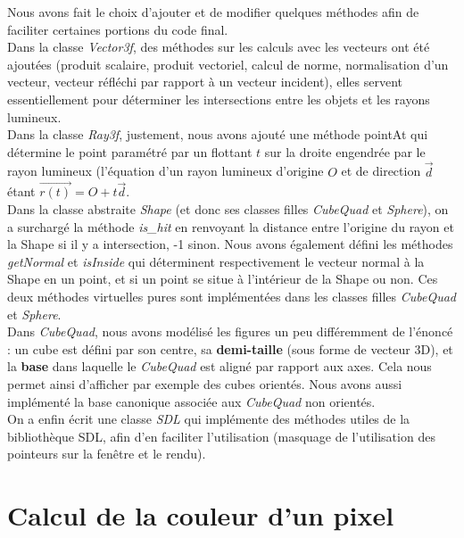 \documentclass[a4paper,oneside,12pt,titlepage]{article}
\begin{document}
\begin{sloppypar}
Nous avons fait le choix d’ajouter et de modifier quelques méthodes afin de faciliter certaines portions du code final. \\[6pt]

Dans la classe \textit{Vector3f}, des méthodes sur les calculs avec les vecteurs ont été ajoutées (produit scalaire, produit vectoriel, calcul de norme, normalisation d’un vecteur, vecteur réfléchi par rapport à un vecteur incident), elles servent essentiellement pour déterminer les intersections entre les objets et les rayons lumineux. \\[6pt]

Dans la classe \textit{Ray3f}, justement, nous avons ajouté une méthode pointAt qui détermine le point paramétré par un flottant $t$ sur la droite engendrée par le rayon lumineux (l'équation d'un rayon lumineux d'origine $O$ et de direction $\vec{d}$ étant $\overrightarrow{r(t)} = O + t\vec{d}$. \\[6pt]

Dans la classe abstraite \textit{Shape} (et donc ses classes filles \textit{CubeQuad} et \textit{Sphere}), on a surchargé la méthode \textit{is\_hit} en renvoyant la distance entre l’origine du rayon et la Shape si il y a intersection, -1 sinon. Nous avons également défini les méthodes \textit{getNormal} et \textit{isInside} qui déterminent respectivement le vecteur normal à la Shape en un point, et si un point se situe à l'intérieur de la Shape ou non. Ces deux méthodes virtuelles pures sont implémentées dans les classes filles \textit{CubeQuad} et \textit{Sphere}. \\[6pt] 

Dans \textit{CubeQuad}, nous avons modélisé les figures un peu différemment de l’énoncé : un cube est défini par son centre, sa \textbf{demi-taille} (sous forme de vecteur 3D), et la \textbf{base} dans laquelle le \textit{CubeQuad} est aligné par rapport aux axes. Cela nous permet ainsi d'afficher par exemple des cubes orientés. Nous avons aussi implémenté la base canonique associée aux \textit{CubeQuad} non orientés. \\[6pt]

On a enfin écrit une classe \textit{SDL} qui implémente des méthodes utiles de la bibliothèque SDL, afin d’en faciliter l’utilisation (masquage de l’utilisation des pointeurs sur la fenêtre et le rendu).

\newpage

\section{Calcul de la couleur d'un pixel}


\end{sloppypar}
\end{document}

